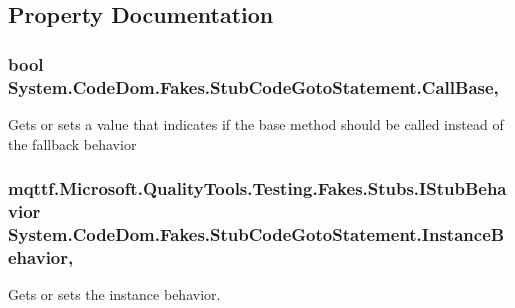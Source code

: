 \subsection{Property Documentation}
\hypertarget{class_system_1_1_code_dom_1_1_fakes_1_1_stub_code_goto_statement_a4aa9aa6d4abaa78ef6eedd9f98f4b9df}{
\subsubsection[{Call\-Base}]{\setlength{\rightskip}{0pt plus 5cm}bool System.\-Code\-Dom.\-Fakes.\-Stub\-Code\-Goto\-Statement.\-Call\-Base\hspace{0.3cm}{\ttfamily [get]}, {\ttfamily [set]}}}\label{class_system_1_1_code_dom_1_1_fakes_1_1_stub_code_goto_statement_a4aa9aa6d4abaa78ef6eedd9f98f4b9df}


Gets or sets a value that indicates if the base method should be called instead of the fallback behavior

\hypertarget{class_system_1_1_code_dom_1_1_fakes_1_1_stub_code_goto_statement_aa2145a06a0977d248e5b3370e4931a19}{
\subsubsection[{Instance\-Behavior}]{\setlength{\rightskip}{0pt plus 5cm}mqttf.\-Microsoft.\-Quality\-Tools.\-Testing.\-Fakes.\-Stubs.\-I\-Stub\-Behavior System.\-Code\-Dom.\-Fakes.\-Stub\-Code\-Goto\-Statement.\-Instance\-Behavior\hspace{0.3cm}{\ttfamily [get]}, {\ttfamily [set]}}}\label{class_system_1_1_code_dom_1_1_fakes_1_1_stub_code_goto_statement_aa2145a06a0977d248e5b3370e4931a19}


Gets or sets the instance behavior.

